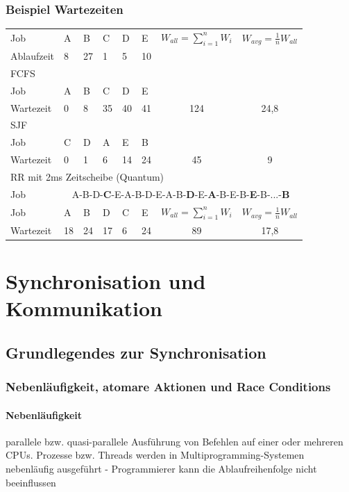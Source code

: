 \documentclass[11pt,a4paper,landscape]{article}
\begin{document}
\begin{multicols*}{3}
	\subsubsection{Beispiel Wartezeiten}
	\begin{tabularx}{\columnwidth}{|l|X|X|X|X|X|c|c|}
		\cline{1-8}
		Job & A & B & C & D & E & $W_{all} = \sum \limits_{i=1}^n W_i$ & $W_{avg} = \frac{1}{n}W_{all}$ \\
		\cline{1-8}
		Ablaufzeit & 8 & 27 & 1 & 5 & 10 & & \\
		\cline{1-8}
		\multicolumn{8}{|l|}{FCFS} \\
		\cline{1-8}
		Job & A & B & C & D & E & & \\
		\cline{1-8}
		Wartezeit & 0 & 8 & 35 & 40 & 41 & 124 & 24,8\\
		\cline{1-8}
		\multicolumn{8}{|l|}{SJF} \\
		\cline{1-8}
		Job & C & D & A & E & B & &\\
		\cline{1-8}
		Wartezeit & 0 & 1 & 6 & 14 & 24 & 45 & 9\\
		\cline{1-8}
		\multicolumn{8}{|l|}{RR mit 2ms Zeitscheibe (Quantum)} \\
		\cline{1-8}
		Job & \multicolumn{7}{c|}{A-B-D-\textbf{C}-E-A-B-D-E-A-B-\textbf{D}-E-\textbf{A}-B-E-B-\textbf{E}-B-...-\textbf{B}} \\
		\cline{1-8}
		Job & A & B & D & C & E & $W_{all} = \sum \limits_{i=1}^n W_i$ & $W_{avg} = \frac{1}{n}W_{all}$ \\
		\cline{1-8}
		Wartezeit & 18 & 24 & 17 & 6 & 24 & 89 & 17,8\\
		\cline{1-8}
	\end{tabularx}
	\section{Synchronisation und Kommunikation}
	\subsection{Grundlegendes zur Synchronisation}
	\subsubsection{Nebenläufigkeit, atomare Aktionen und Race Conditions}
	\paragraph{Nebenläufigkeit} parallele bzw. quasi-parallele Ausführung von Befehlen auf einer oder mehreren CPUs. Prozesse bzw. Threads werden in Multiprogramming-Systemen nebenläufig ausgeführt - Programmierer kann die Ablaufreihenfolge nicht beeinflussen

\end{multicols*}
\end{document}
